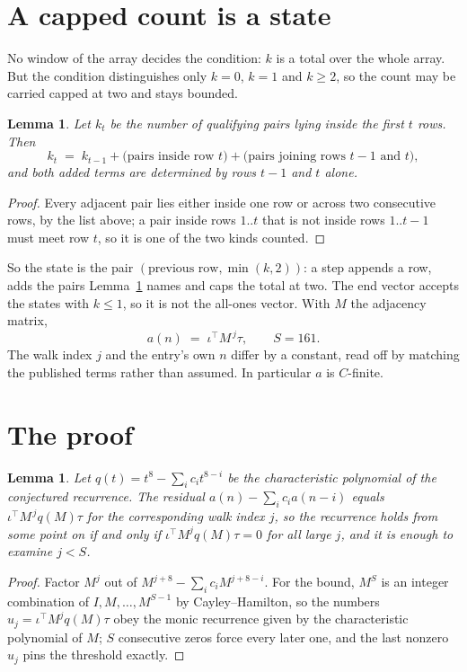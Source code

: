 \documentclass[11pt,a4paper]{article}
\theoremstyle{plain}
\newtheorem{lemma}[theorem]{Lemma}
\theoremstyle{definition}
\begin{document}
\section{A capped count is a state}

No window of the array decides the condition: $k$ is a total over the whole array. But the
condition distinguishes only $k=0$, $k=1$ and $k\ge2$, so the count may be carried capped at
two and stays bounded.

\begin{lemma}\label{lem:cap}
Let $k_t$ be the number of qualifying pairs lying inside the first $t$ rows. Then
\[
k_{t}\;=\;k_{t-1}+\bigl(\text{pairs inside row } t\bigr)
+\bigl(\text{pairs joining rows } t-1 \text{ and } t\bigr),
\]
and both added terms are determined by rows $t-1$ and $t$ alone.
\end{lemma}

\begin{proof}
Every adjacent pair lies either inside one row or across two consecutive rows, by the list
above; a pair inside rows $1..t$ that is not inside rows $1..t-1$ must meet row $t$, so it is
one of the two kinds counted.
\end{proof}

So the state is the pair $(\text{previous row},\min(k,2))$: a step appends a row, adds the
pairs Lemma~\ref{lem:cap} names and caps the total at two. The end vector accepts the states
with $k\le1$, so it is not the all-ones vector. With $M$ the adjacency matrix,
\[
a(n)\;=\;\iota^{\!\top}M^{\,j}\tau ,\qquad S=161.
\]
The walk index $j$ and the entry's own $n$ differ by a constant, read off by matching the
published terms rather than assumed. In particular $a$ is $C$-finite.

\section{The proof}

\begin{lemma}\label{lem:crit}
Let $q(t)=t^{8}-\sum_i c_it^{8-i}$ be the characteristic polynomial of the
conjectured recurrence. The residual $a(n)-\sum_ic_ia(n-i)$ equals
$\iota^{\!\top}M^{\,j}q(M)\tau$ for the corresponding walk index $j$, so the recurrence
holds from some point on if and only if $\iota^{\!\top}M^{j}q(M)\tau=0$ for all large $j$,
and it is enough to examine $j<S$.
\end{lemma}

\begin{proof}
Factor $M^{j}$ out of $M^{j+8}-\sum_ic_iM^{j+8-i}$. For the bound, $M^{S}$
is an integer combination of $I,M,\dots,M^{S-1}$ by Cayley--Hamilton, so the numbers
$u_j=\iota^{\!\top}M^{j}q(M)\tau$ obey the monic recurrence given by the characteristic
polynomial of $M$; $S$ consecutive zeros force every later one, and the last nonzero $u_j$
pins the threshold exactly.
\end{proof}
\end{document}
